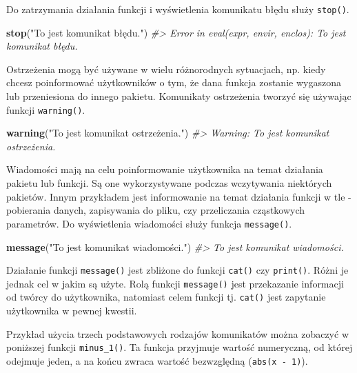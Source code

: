 \documentclass[paper=6in:9in,pagesize=pdftex,headinclude=on,footinclude=on,10pt]{scrbook}
\makeatletter
\newenvironment{Shaded}{\begin{snugshade}}{\end{snugshade}}
\newcommand{\CommentTok}[1]{\textcolor[rgb]{0.56,0.35,0.01}{\textit{#1}}}
\newcommand{\KeywordTok}[1]{\textcolor[rgb]{0.13,0.29,0.53}{\textbf{#1}}}
\newcommand{\NormalTok}[1]{#1}
\newcommand{\StringTok}[1]{\textcolor[rgb]{0.31,0.60,0.02}{#1}}
\newenvironment{kframe}{%
\medskip{}
\setlength{\fboxsep}{.8em}
 \def\at@end@of@kframe{}%
 \ifinner\ifhmode%
  \def\at@end@of@kframe{\end{minipage}}%
  \begin{minipage}{\columnwidth}%
 \fi\fi%
 \def\FrameCommand##1{\hskip\@totalleftmargin \hskip-\fboxsep
 \colorbox{shadecolor}{##1}\hskip-\fboxsep
     \hskip-\linewidth \hskip-\@totalleftmargin \hskip\columnwidth}%
 \MakeFramed {\advance\hsize-\width
   \@totalleftmargin\z@ \linewidth\hsize
   \@setminipage}}%
 {\par\unskip\endMakeFramed%
 \at@end@of@kframe}
\newenvironment{rmdblock}[1]
  {
  \begin{itemize}
  \renewcommand{\labelitemi}{
    \raisebox{-.7\height}[0pt][0pt]{
      {\setkeys{Gin}{width=3em,keepaspectratio}\texttt{[image: images/\#1]}}
    }
  }
  \setlength{\fboxsep}{1em}
  \begin{kframe}
  \item
  }
  {
  \end{kframe}
  \end{itemize}
  }
\newenvironment{rmdinfo}
  {\begin{rmdblock}{compass}}
  {\end{rmdblock}}
\makeatother
\begin{document}
Do zatrzymania działania funkcji i wyświetlenia komunikatu błędu służy \texttt{stop()}.

\begin{Shaded}
\begin{Highlighting}[]
\KeywordTok{stop}\NormalTok{(}\StringTok{"To jest komunikat błędu."}\NormalTok{)}
\CommentTok{#> Error in eval(expr, envir, enclos): To jest komunikat błędu.}
\end{Highlighting}
\end{Shaded}

Ostrzeżenia mogą być używane w wielu różnorodnych sytuacjach, np. kiedy chcesz poinformować użytkowników o tym, że dana funkcja zostanie wygaszona lub przeniesiona do innego pakietu.
Komunikaty ostrzeżenia tworzyć się używając funkcji \texttt{warning()}.

\begin{Shaded}
\begin{Highlighting}[]
\KeywordTok{warning}\NormalTok{(}\StringTok{"To jest komunikat ostrzeżenia."}\NormalTok{)}
\CommentTok{#> Warning: To jest komunikat ostrzeżenia.}
\end{Highlighting}
\end{Shaded}

Wiadomości mają na celu poinformowanie użytkownika na temat działania pakietu lub funkcji.
Są one wykorzystywane podczas wczytywania niektórych pakietów.
Innym przykładem jest informowanie na temat działania funkcji w tle - pobierania danych, zapisywania do pliku, czy przeliczania cząstkowych parametrów.
Do wyświetlenia wiadomości służy funkcja \texttt{message()}.

\begin{Shaded}
\begin{Highlighting}[]
\KeywordTok{message}\NormalTok{(}\StringTok{"To jest komunikat wiadomości."}\NormalTok{)}
\CommentTok{#> To jest komunikat wiadomości.}
\end{Highlighting}
\end{Shaded}

\begin{rmdinfo}
Działanie funkcji \texttt{message()} jest zbliżone do funkcji \texttt{cat()} czy \texttt{print()}.
Różni je jednak cel w jakim są użyte.
Rolą funkcji \texttt{message()} jest przekazanie informacji od twórcy do użytkownika, natomiast celem funkcji tj. \texttt{cat()} jest zapytanie użytkownika w pewnej kwestii.
\end{rmdinfo}

Przykład użycia trzech podstawowych rodzajów komunikatów można zobaczyć w poniższej funkcji \texttt{minus\_1()}.
Ta funkcja przyjmuje wartość numeryczną, od której odejmuje jeden, a na końcu zwraca wartość bezwzględną (\texttt{abs(x\ -\ 1)}).
\end{document}

